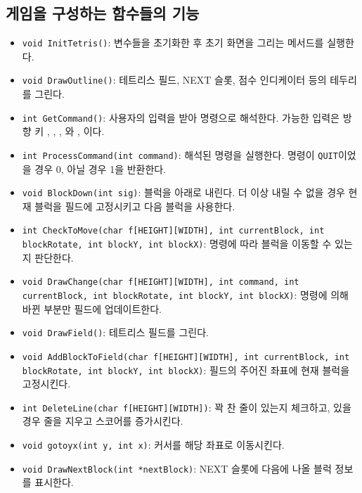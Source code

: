 \subsection{게임을 구성하는 함수들의 기능}
\begin{itemize}
    \item \texttt{void InitTetris()}: 변수들을 초기화한 후 초기 화면을 그리는 메서드를 실행한다.
    \item \texttt{void DrawOutline()}: 테트리스 필드, NEXT 슬롯, 점수 인디케이터 등의 테두리를 그린다.
    \item \texttt{int GetCommand()}: 사용자의 입력을 받아 명령으로 해석한다.
    가능한 입력은 방향 키 \keys{\arrowkeyup}, \keys{\arrowkeydown},
    \keys{\arrowkeyright}, \keys{\arrowkeyleft}와 , 이다.
    \item \texttt{int ProcessCommand(int command)}: 해석된 명령을 실행한다.
    명령이 \texttt{QUIT}이었을 경우 0, 아닐 경우 1을 반환한다.
    \item \texttt{void BlockDown(int sig)}: 블럭을 아래로 내린다. 더 이상 내릴 수 없을 경우
    현재 블럭을 필드에 고정시키고 다음 블럭을 사용한다.
    \item \texttt{int CheckToMove(char f[HEIGHT][WIDTH], int currentBlock, int blockRotate, int blockY, int blockX)}:
    명령에 따라 블럭을 이동할 수 있는지 판단한다.
    \item \texttt{void DrawChange(char f[HEIGHT][WIDTH], int command, int currentBlock, int blockRotate, int blockY, int blockX)}:
    명령에 의해 바뀐 부분만 필드에 업데이트한다.
    \item \texttt{void DrawField()}: 테트리스 필드를 그린다.
    \item \texttt{void AddBlockToField(char f[HEIGHT][WIDTH], int currentBlock, int blockRotate, int blockY, int blockX)}:
    필드의 주어진 좌표에 현재 블럭을 고정시킨다.
    \item \texttt{int DeleteLine(char f[HEIGHT][WIDTH])}: 꽉 찬 줄이 있는지 체크하고, 있을 경우 줄을 지우고 스코어를 증가시킨다.
    \item \texttt{void gotoyx(int y, int x)}: 커서를 해당 좌표로 이동시킨다.
    \item \texttt{void DrawNextBlock(int *nextBlock)}: NEXT 슬롯에 다음에 나올 블럭 정보를 표시한다.

\end{itemize}

